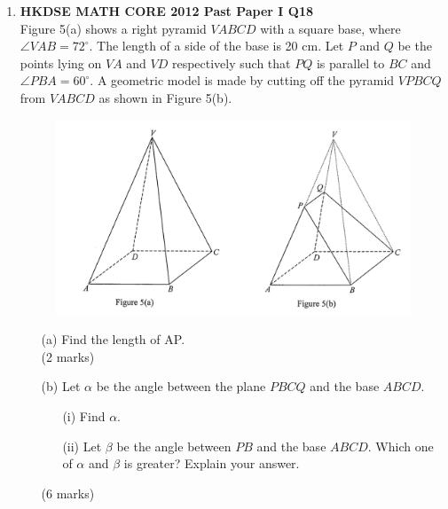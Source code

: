 \documentclass[12pt]{article}
\begin{document}
\begin{enumerate}
	\item \textbf{HKDSE MATH CORE 2012 Past Paper I Q18}\\
	Figure 5(a) shows a right pyramid $VABCD$ with a square base, where $\angle VAB = 72^\circ$. The length of a side of the base is 20 cm. Let $P$ and $Q$ be the points lying on $VA$ and $VD$ respectively such that $PQ$ is parallel to $BC$ and $\angle PBA = 60^\circ$. A geometric model is made by cutting off the pyramid $VPBCQ$ from $VABCD$ as shown in Figure 5(b).
	\begin{figure}[H]
		\centering
		\includegraphics[width = .3\linewidth]{2012Figure1.5}
	\end{figure}
	\begin{enumerate}
		\item[(a)] Find the length of AP. \\(2 marks)
		\item[(b)] Let $\alpha$ be the angle between the plane $PBCQ$ and the base $ABCD$.	
		\begin{enumerate}
			\item[(i)] Find $\alpha$.
			\item[(ii)] Let $\beta$ be the angle between $PB$ and the base $ABCD$. Which one of $\alpha$ and $\beta$ is greater? Explain your answer.	
		\end{enumerate}
		(6 marks)
	\end{enumerate}


\end{enumerate}
\end{document}
